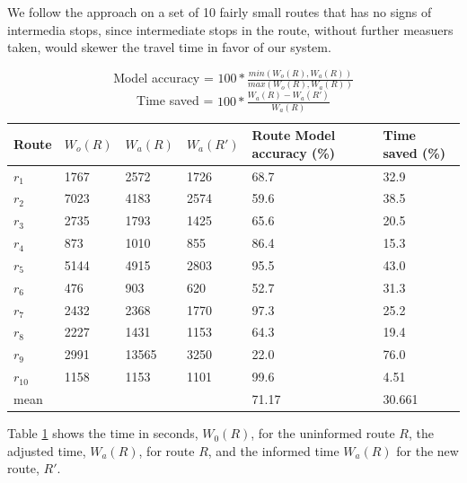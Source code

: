 We follow the approach on a set of 10 fairly small routes that has no signs of intermedia stops, since intermediate stops in the route, without further measuers taken, would skewer the travel time in favor of our system. 
\begin{table}[]
\centering
\begin{tabular}{llllll}
\textbf{Route} & \textbf{$W_o(R)$} & \textbf{$W_a(R)$}  & \textbf{$W_a(R')$} & \textbf{Route Model accuracy (\%)} & \textbf{Time saved (\%)} \\ \hline
$r_1$          & 1767              & 2572               & 1726               & 68.7                         & 32.9 \\
$r_2$          & 7023              & 4183               & 2574               & 59.6                         & 38.5 \\
$r_3$          & 2735              & 1793               & 1425               & 65.6                         & 20.5 \\
$r_4$          & 873               & 1010               & 855                & 86.4                         & 15.3 \\
$r_5$          & 5144              & 4915               & 2803               & 95.5                         & 43.0 \\
$r_6$          & 476               & 903                & 620                & 52.7                         & 31.3 \\
$r_7$          & 2432              & 2368               & 1770               & 97.3                         & 25.2 \\
$r_8$          & 2227              & 1431               & 1153               & 64.3                         & 19.4 \\
$r_9$          & 2991              & 13565              & 3250               & 22.0                         & 76.0 \\
$r_{10}$       & 1158              & 1153               & 1101               & 99.6                         & 4.51 \\ \hline
mean       	   &                   &                    &                    & 71.17                        & 30.661
\end{tabular}
\caption{Model accuracy = $100 * \frac{min(W_o(R), W_a(R))}{max(W_o(R), W_a(R))}$\\
	     Time saved = $100 * \frac{W_a(R) - W_a(R')}{W_a(R)}$}
\label{tab:eval-results}
\end{table}
Table \ref{tab:eval-results} shows the time in seconds, $W_0(R)$, for the uninformed route $R$,  the adjusted time, $W_a(R)$, for route $R$, and the informed time $W_a(R)$ for the new route, $R'$.

